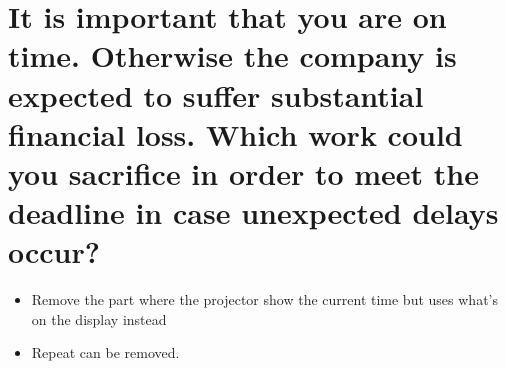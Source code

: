 \documentclass[10pt, a4]{article}
\begin{document}
\section{It is important that you are on time. 
	Otherwise the company is expected to suffer substantial financial loss. 
	Which work could you sacrifice in order to meet the deadline in case unexpected delays occur?}

\begin{itemize}
	\item Remove the part where the projector show the current time but uses what's on the display instead
	\item Repeat can be removed.
\end{itemize}
\end{document}
